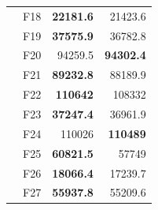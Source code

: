 \begin{table}[]
\begin{tabular}{ll|r|r|}
\multicolumn{1}{|l|}{\cellcolor[HTML]{ECF4FF}}                           & \cellcolor[HTML]{FCE6AB}F18     & \cellcolor[HTML]{D3FFB6}\textbf{22181.6}                       & 21423.6                                                   \\ \cline{2-4} 
\multicolumn{1}{|l|}{\cellcolor[HTML]{ECF4FF}}                           & \cellcolor[HTML]{FCE6AB}F19     & \cellcolor[HTML]{D3FFB6}\textbf{37575.9}                       & 36782.8                                                   \\ \cline{2-4} 
\multicolumn{1}{|l|}{\cellcolor[HTML]{ECF4FF}}                           & \cellcolor[HTML]{FCE6AB}F20     & 94259.5                                                        & \cellcolor[HTML]{D3FFB6}\textbf{94302.4}                  \\ \cline{2-4} 
\multicolumn{1}{|l|}{\cellcolor[HTML]{ECF4FF}}                           & \cellcolor[HTML]{FCE6AB}F21     & \cellcolor[HTML]{D3FFB6}\textbf{89232.8}                       & 88189.9                                                   \\ \cline{2-4} 
\multicolumn{1}{|l|}{\cellcolor[HTML]{ECF4FF}}                           & \cellcolor[HTML]{FCE6AB}F22     & \cellcolor[HTML]{D3FFB6}\textbf{110642}                        & 108332                                                    \\ \cline{2-4} 
\multicolumn{1}{|l|}{\cellcolor[HTML]{ECF4FF}}                           & \cellcolor[HTML]{FCE6AB}F23     & \cellcolor[HTML]{D3FFB6}\textbf{37247.4}                       & 36961.9                                                   \\ \cline{2-4} 
\multicolumn{1}{|l|}{\cellcolor[HTML]{ECF4FF}}                           & \cellcolor[HTML]{FCE6AB}F24     & 110026                                                         & \cellcolor[HTML]{D3FFB6}\textbf{110489}                   \\ \cline{2-4} 
\multicolumn{1}{|l|}{\cellcolor[HTML]{ECF4FF}}                           & \cellcolor[HTML]{FCE6AB}F25     & \cellcolor[HTML]{D3FFB6}\textbf{60821.5}                       & 57749                                                     \\ \cline{2-4} 
\multicolumn{1}{|l|}{\cellcolor[HTML]{ECF4FF}}                           & \cellcolor[HTML]{FCE6AB}F26     & \cellcolor[HTML]{D3FFB6}\textbf{18066.4}                       & 17239.7                                                   \\ \cline{2-4} 
\multicolumn{1}{|l|}{\cellcolor[HTML]{ECF4FF}}                           & \cellcolor[HTML]{FCE6AB}F27     & \cellcolor[HTML]{D3FFB6}\textbf{55937.8}                       & 55209.6                                                   \\ \cline{2-4} 

\end{tabular}
\end{table}
